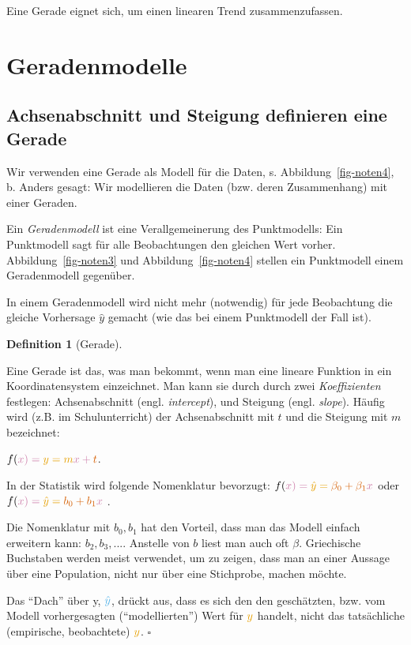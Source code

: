 \documentclass[
  letterpaper,
]{scrbook}
\theoremstyle{definition}
\theoremstyle{definition}
\newtheorem{definition}{Definition}[chapter]
\theoremstyle{definition}
\theoremstyle{remark}
\begin{document}
Eine Gerade eignet sich, um einen linearen Trend zusammenzufassen.

\section{Geradenmodelle}\label{geradenmodelle}

\subsection{Achsenabschnitt und Steigung definieren eine
Gerade}\label{achsenabschnitt-und-steigung-definieren-eine-gerade}

Wir verwenden eine Gerade als Modell für die Daten, s.
Abbildung~\ref{fig-noten4}, b. Anders gesagt: Wir modellieren die Daten
(bzw. deren Zusammenhang) mit einer Geraden.

Ein \emph{Geradenmodell} ist eine Verallgemeinerung des Punktmodells:
Ein Punktmodell sagt für alle Beobachtungen den gleichen Wert vorher.
Abbildung~\ref{fig-noten3} und Abbildung~\ref{fig-noten4} stellen ein
Punktmodell einem Geradenmodell gegenüber.

In einem Geradenmodell wird nicht mehr (notwendig) für jede Beobachtung
die gleiche Vorhersage \(\hat{y}\) gemacht (wie das bei einem
Punktmodell der Fall ist).

\begin{definition}[Gerade]\protect\hypertarget{def-gerade}{}\label{def-gerade}

Eine Gerade ist das, was man bekommt, wenn man eine lineare Funktion in
ein Koordinatensystem einzeichnet. Man kann sie durch durch zwei
\emph{Koeffizienten} festlegen: Achsenabschnitt (engl.
\emph{intercept}), und Steigung (engl. \emph{slope}). Häufig wird (z.B.
im Schulunterricht) der Achsenabschnitt mit \(t\) und die Steigung mit
\(m\) bezeichnet:

\(f(\color{xcol}{x})=\color{ycol}{y}={m} \color{xcol}{x} + \color{beta0col}{t}\).

In der Statistik wird folgende Nomenklatur bevorzugt:
\(f(\color{xcol}{x})=\color{ycol}{\hat{y}}=\color{beta0col}{\beta_0} + {\beta_1} \color{xcol}{x}\)
oder
\(f(\color{xcol}{x})=\color{ycol}{\hat{y}}= \color{beta0col}{b_0} + {b_1} \color{xcol}{x}\)
.

Die Nomenklatur mit \(b_0, b_1\) hat den Vorteil, dass man das Modell
einfach erweitern kann: \(b_2, b_3, ...\). Anstelle von \(b\) liest man
auch oft \(\beta\). Griechische Buchstaben werden meist verwendet, um zu
zeigen, dass man an einer Aussage über eine Population, nicht nur über
eine Stichprobe, machen möchte.

Das ``Dach'' über y, \(\color{modelcol}{\hat{y}}\), drückt aus, dass es
sich den den geschätzten, bzw. vom Modell vorhergesagten
(``modellierten'') Wert für \(\color{ycol}{y}\) handelt, nicht das
tatsächliche (empirische, beobachtete) \(\color{ycol}{y}\). \(\square\)

\end{definition}
\end{document}
